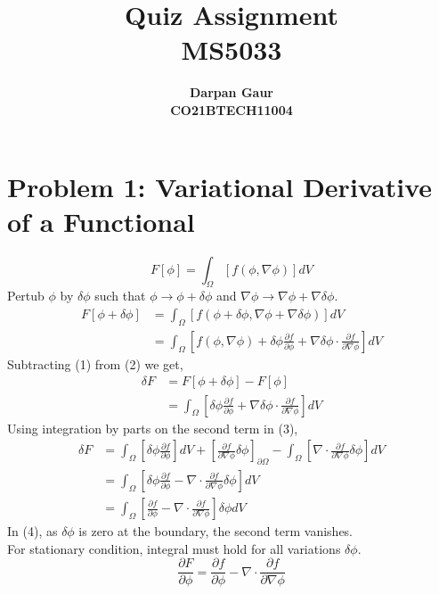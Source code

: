 \documentclass[12pt]{article}
\title{
    \textbf{Quiz Assignment} \\ 
    \textbf{MS5033} \\
}
\author{
    \textbf{Darpan Gaur} \\
    \textbf{CO21BTECH11004}
}
\date{}
\begin{document}
\maketitle

\hrulefill

\section*{Problem 1: Variational Derivative of a Functional}
\begin{equation*}\tag{1}
    F[\phi] = \int_{\Omega} [f(\phi, \nabla \phi)] dV 
\end{equation*}
Pertub $\phi$ by $\delta \phi$ such that $\phi \rightarrow \phi + \delta \phi$ and $\nabla \phi \rightarrow \nabla \phi + \nabla \delta \phi$. 
\begin{equation*}\tag{2}
    \begin{split}
        F[\phi + \delta \phi] &= \int_{\Omega} [f(\phi + \delta \phi, \nabla \phi + \nabla \delta \phi)] dV \\
        &= \int_{\Omega} [f(\phi, \nabla \phi) + \delta \phi \frac{\partial f}{\partial \phi} + \nabla \delta \phi \cdot \frac{\partial f}{\partial \nabla \phi}] dV 
    \end{split}
\end{equation*}
Subtracting (1) from (2) we get,
\begin{equation*}\tag{3}
    \begin{split}
        \delta F &= F[\phi + \delta \phi] - F[\phi] \\
        &= \int_{\Omega} [\delta \phi \frac{\partial f}{\partial \phi} + \nabla \delta \phi \cdot \frac{\partial f}{\partial \nabla \phi}] dV
    \end{split}
\end{equation*}
Using integration by parts on the second term in (3),
\begin{equation*}\tag{4}
    \begin{split}
        \delta F &= \int_{\Omega} [\delta \phi \frac{\partial f}{\partial \phi}] dV + [\frac{\partial f}{\partial \nabla \phi} \delta \phi]_{\partial \Omega} - \int_{\Omega} [\nabla \cdot \frac{\partial f}{\partial \nabla \phi} \delta \phi] dV \\ 
        &= \int_{\Omega} [\delta \phi \frac{\partial f}{\partial \phi} - \nabla \cdot \frac{\partial f}{\partial \nabla \phi} \delta \phi] dV \\
        &= \int_{\Omega} [\frac{\partial f}{\partial \phi} - \nabla \cdot \frac{\partial f}{\partial \nabla \phi}] \delta \phi dV
    \end{split}
\end{equation*}
In (4), as $\delta \phi$ is zero at the boundary, the second term vanishes.\\ 
For stationary condition, integral must hold for all variations $\delta \phi$. 
\begin{equation*}\tag{5}
    \boxed{\frac{\partial F}{\partial \phi} = \frac{\partial f}{\partial \phi} - \nabla \cdot \frac{\partial f}{\partial \nabla \phi} }
\end{equation*}
\end{document}

